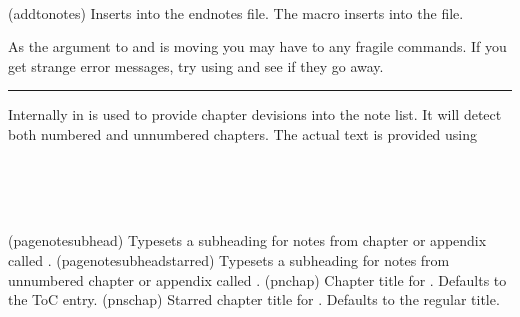 



\bigskip



\begin{syntax}
\cmd{\addtonotes} \\
\end{syntax}
\glossary(addtonotes)%
  {}%
  {Inserts  into the endnotes  file.}%
The macro \cmd{\addtonotes} inserts  into the 
file. 

\begin{note}
  As the argument to \cmd{\pagenote} and \cmd{\addtonotes} is moving
  you may have to \cmd{\protect} any fragile commands. If you get
  strange error messages, try using \cmd{\protect} and see if they go
  away.
\end{note}
\fancybreak{}

Internally in \cmd{\pagenote} \cmd{\addtonotes} is used to provide
chapter devisions into the note list. It will detect both numbered and
unnumbered chapters. The actual text is provided using
\begin{syntax}
\cmd{\pagenotesubhead} \\
\cmd{\pagenotesubheadstarred} \\
\cmd{\pnchap} \cmd{\pnschap} \\
\end{syntax}
\glossary(pagenotesubhead)%
  {}%
  {Typesets a subheading for notes from chapter or appendix  
    called .}%
\glossary(pagenotesubheadstarred)%
  {}%
  {Typesets a subheading for notes from unnumbered chapter or appendix
       called .}%
\glossary(pnchap)%
  {}%
  {Chapter title for . Defaults to the ToC entry.}
\glossary(pnschap)%
{}%
{Starred chapter title for . Defaults to the regular title.}
  
